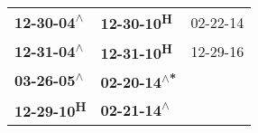 \begin{supertabular}{lll}
 \textbf{12-30-04\textsuperscript{$\wedge$}} &          \textbf{12-30-10\textsuperscript{H}} &  02-22-14\textsuperscript{} \\
 \textbf{12-31-04\textsuperscript{$\wedge$}} &          \textbf{12-31-10\textsuperscript{H}} &  12-29-16\textsuperscript{} \\
 \textbf{03-26-05\textsuperscript{$\wedge$}} &  \textbf{02-20-14\textsuperscript{$\wedge$*}} &                             \\
        \textbf{12-29-10\textsuperscript{H}} &   \textbf{02-21-14\textsuperscript{$\wedge$}} &                             \\
\end{supertabular}
